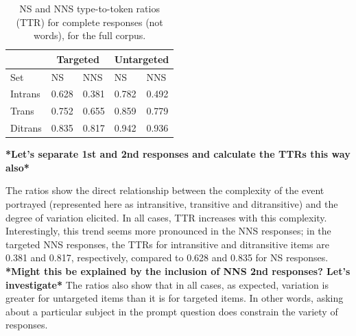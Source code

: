 \begin{table}[hb!]
\begin{center}
\begin{tabular}{|l||l|l||l|l|}
\hline
 & \multicolumn{2}{|c||}{Targeted} & \multicolumn{2}{|c|}{Untargeted} \\
\hline
 Set & NS & NNS & NS & NNS \\
\hline
\hline
Intrans & 0.628 & 0.381 & 0.782 & 0.492 \\
\hline
Trans & 0.752 & 0.655 & 0.859 & 0.779 \\ %
\hline
Ditrans & 0.835 & 0.817 & 0.942 & 0.936 \\ 
\hline
\end{tabular}
\caption{\label{tab:ttr} NS and NNS type-to-token ratios (TTR) for complete responses (not words), for the full corpus.}
\end{center}
\end{table}

\textbf{*Let's separate 1st and 2nd responses and calculate the TTRs this way also*}

The ratios show the direct relationship between the complexity of the event portrayed (represented here as intransitive, transitive and ditransitive) and the degree of variation elicited. In all cases, TTR increases with this complexity. Interestingly, this trend seems more pronounced in the NNS responses; in the targeted NNS responses, the TTRs for intransitive and ditransitive items are 0.381 and 0.817, respectively, compared to 0.628 and 0.835 for NS responses. \textbf{*Might this be explained by the inclusion of NNS 2nd responses? Let's investigate*} The ratios also show that in all cases, as expected, variation is greater for untargeted items than it is for targeted items. In other words, asking about a particular subject in the prompt question does constrain the variety of responses.


